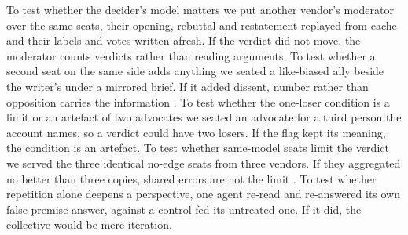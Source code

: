 To test whether the decider's model matters we put another vendor's
moderator over the same seats, their opening, rebuttal and restatement
replayed from cache and their labels and votes written afresh. If the
verdict did not move, the moderator counts verdicts rather than reading
arguments. %
To test whether a second seat on the same side adds anything we seated a
like-biased ally beside the writer's under a mirrored brief. If it added
dissent, number rather than opposition carries the information
\citep{krishna2001model}. %
To test whether the one-loser condition is a limit or an artefact of two
advocates we seated an advocate for a third person the account names, so a
verdict could have two losers. If the flag kept its meaning, the
condition is an
artefact. %
To test whether same-model seats limit the verdict we served the three
identical no-edge seats from three vendors. If they aggregated no better
than three copies, shared errors are not the limit
\citep{ladha1992condorcet}. %
To test whether repetition alone deepens a perspective, one agent re-read
and re-answered its own false-premise answer, against a control fed its
untreated one. If it did, the collective would be mere
iteration. %

